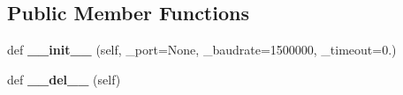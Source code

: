 \subsection*{Public Member Functions}
\begin{DoxyCompactItemize}
\item 
def {\bfseries \+\_\+\+\_\+init\+\_\+\+\_\+} (self, \+\_\+port=None, \+\_\+baudrate=1500000, \+\_\+timeout=0.)\hypertarget{classkondoServoLib_1_1b3mCtrl_07_xE3_x82_xB3_xE3_x83_x94_xE3_x83_xBC_08_1_1B3mClass_aeed52d02373a5dc57b5a55e4ea1fc789}{}\label{classkondoServoLib_1_1b3mCtrl_07_xE3_x82_xB3_xE3_x83_x94_xE3_x83_xBC_08_1_1B3mClass_aeed52d02373a5dc57b5a55e4ea1fc789}

\item 
def {\bfseries \+\_\+\+\_\+del\+\_\+\+\_\+} (self)\hypertarget{classkondoServoLib_1_1b3mCtrl_07_xE3_x82_xB3_xE3_x83_x94_xE3_x83_xBC_08_1_1B3mClass_a770de49ce6347a36a406b5ebbb28999b}{}\label{classkondoServoLib_1_1b3mCtrl_07_xE3_x82_xB3_xE3_x83_x94_xE3_x83_xBC_08_1_1B3mClass_a770de49ce6347a36a406b5ebbb28999b}


\end{DoxyCompactItemize}
